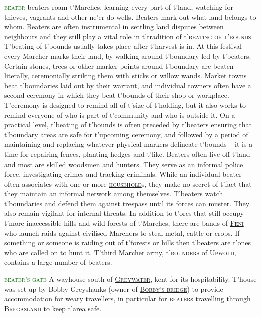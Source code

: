 \documentclass[twoside,11pt,b5paper,twocolumn]{scrbook}
\newcommand{\estcab}[1]{\textsc{\textcolor{marron}{#1}}}
\newcommand{\keyword}[1]{\textcolor{darkgreen}{#1}}
\renewcommand{\paragraph}[1]{\par\noindent\markboth{#1}{#1}\estcab{\keyword{#1}}\label{#1} }
\newcommand{\see}[1]{{\estcab{\hyperref[#1]{#1}}}}
\begin{document}
\paragraph{beater} beaters roam t'Marches, learning every part of t'land, watching for thieves, vagrants and other ne'er-do-wells. Beaters mark out what land belongs to whom.  Beaters are often instrumental in settling land disputes between neighbours and they still play a vital role in t'tradition of t'\see{beating of t'bounds}. T'beating of t'bounds usually takes place after t'harvest is in. At this festival every Marcher marks their land, by walking around t'boundary led by t'beaters. Certain stones, trees or other marker points around t'boundary are beaten literally, ceremonially striking them with sticks or willow wands. Market towns beat t'boundaries laid out by their warrant, and individual towners often have a second ceremony in which they beat t'bounds of their shop or workplace. T'ceremony is designed to remind all of t'size of t'holding, but it also works to remind everyone of who is part of t'community and who is outside it. On a practical level, t'beating of t'bounds is often preceded by t'beaters ensuring that t'boundary areas are safe for t'upcoming ceremony, and followed by a period of maintaining and replacing whatever physical markers delineate t'bounds – it is a time for repairing fences, planting hedges and t'like. Beaters often live off t'land and most are skilled woodsmen and hunters. They serve as an informal police force, investigating crimes and tracking criminals. While an individual beater often associates with one or more \see{household}s, they make no secret of t'fact that they maintain an informal network among themselves. T'beaters watch t'boundaries and defend them against trespass until its forces can muster. They also remain vigilant for internal threats. In addition to t'orcs that still occupy t'more inaccessible hills and wild forests of t'Marches, there are bands of \see{Feni} who launch raids against civilised Marchers to steal metal, cattle or crops. If something or someone is raiding out of t'forests or hills then t'beaters are t'ones who are called on to hunt it. T'third Marcher army, t'\see{bounders} of \see{Upwold}, contains a large number of beaters.
\paragraph{beater's gate} A wayhouse south of \see{Greywater}, kent for its hospitability. T'house was set up by Bobby Greyshanks (owner of \see{Bobby's bridge}) to provide accommodation for weary travellers, in particular for \see{beater}s travelling through \see{Bregasland} to keep t'area safe.
\end{document}

